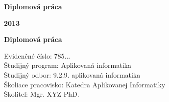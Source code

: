 \begin{center}
\centerline{\LARGE\sc\textbf\skola}
\sc\LARGE\textbf\fakulta
\end{center}

\vspace*{8cm}

\begin{center}
\begin{minipage}{0.8\textwidth}
\begin{center}
 \LARGE\sc\textbf\nazov
 \vspace{1em}
 \centerline{\Large\bf Diplomová práca}
\end{center}
\end{minipage}
\end{center}

\vfill
\noindent
 {\bf 2013}  \hfill {\bf \autor}
\thispagestyle{empty}



\newpage
\begin{center}
\centerline{\LARGE\sc\textbf\skola}
\sc\LARGE\textbf\fakulta
\end{center}

\vspace*{8cm}

\begin{center}
\begin{minipage}{0.8\textwidth}
\begin{center}
 \LARGE\sc\textbf\nazov 
\end{center}
\vspace{1em}
\centerline{\Large\bf Diplomová práca}
\end{minipage}
\end{center}

\vspace{5cm}

\linespread{1.3}%
\selectfont

\noindent
Evidenčné číslo: \hspace{1.7em}785...\\
Študijný program: \hspace{0.8em} Aplikovaná informatika\\
Študijný odbor:  \hspace{1.85em} 9.2.9. aplikovaná informatika\\
Školiace pracovisko: Katedra Aplikovanej Informatiky\\
Školiteľ:  \hspace{4.6em} Mgr. XYZ PhD.

